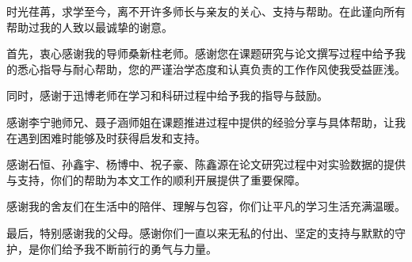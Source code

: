 \begin{acknowledgement}
时光荏苒，求学至今，离不开许多师长与亲友的关心、支持与帮助。在此谨向所有帮助过我的人致以最诚挚的谢意。

首先，衷心感谢我的导师桑新柱老师。感谢您在课题研究与论文撰写过程中给予我的悉心指导与耐心帮助，您的严谨治学态度和认真负责的工作作风使我受益匪浅。

同时，感谢于迅博老师在学习和科研过程中给予我的指导与鼓励。

感谢李宁驰师兄、聂子涵师姐在课题推进过程中提供的经验分享与具体帮助，让我在遇到困难时能够及时获得启发和支持。

感谢石恒、孙鑫宇、杨博中、祝子豪、陈鑫源在论文研究过程中对实验数据的提供与支持，你们的帮助为本文工作的顺利开展提供了重要保障。

感谢我的舍友们在生活中的陪伴、理解与包容，你们让平凡的学习生活充满温暖。

最后，特别感谢我的父母。感谢你们一直以来无私的付出、坚定的支持与默默的守护，是你们给予我不断前行的勇气与力量。
\end{acknowledgement}
